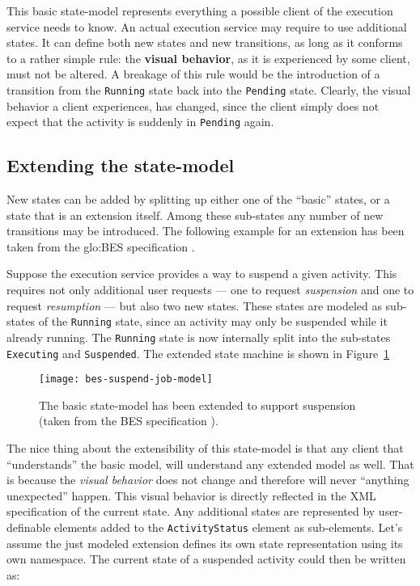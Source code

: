 This  basic state-model  represents everything  a possible  client  of the
execution service needs  to know. An actual execution  service may require
to  use  additional  states.   It  can  define both  new  states  and  new
transitions,  as  long  as  it  conforms  to a  rather  simple  rule:  the
\textbf{visual behavior}, as it is experienced by some client, must not be
altered. A breakage of this rule would be the introduction of a transition
from  the \texttt{Running}  state  back into  the \texttt{Pending}  state.
Clearly, the visual behavior a  client experiences, has changed, since the
client  simply  does   not  expect  that  the  activity   is  suddenly  in
\texttt{Pending} again.

\subsection{Extending the state-model}

New  states can  be added  by  splitting up  either one  of the  ``basic''
states, or  a state that is  an extension itself.   Among these sub-states
any number  of new transitions  may be introduced.  The  following example
for  an extension  has  been taken  from  the \gls{glo:BES}  specification
\cite{ogsa-bes}.

Suppose the execution service provides  a way to suspend a given activity.
This  requires  not only  additional  user  requests  --- one  to  request
\emph{suspension} and  one to request  \emph{resumption} --- but  also two
new states. These states are modeled as sub-states of the \texttt{Running}
state, since an  activity may only be suspended  while it already running.
The  \texttt{Running} state is  now internally  split into  the sub-states
\texttt{Executing} and \texttt{Suspended}.   The extended state machine is
shown in Figure~\ref{fig:bes-suspend-model}

\begin{figure}[h]
  \centering
  \texttt{[image: bes-suspend-job-model]}
  \caption[Extended  BES Job-State-Model]{The  basic state-model  has been
    extended  to  support suspension  (taken  from  the BES  specification
    \cite{ogsa-bes}).}
  \label{fig:bes-suspend-model}
\end{figure}

The nice  thing about  the extensibility of  this state-model is  that any
client that ``understands'' the  basic model, will understand any extended
model as well. That is  because the \emph{visual behavior} does not change
and  therefore  will never  ``anything  unexpected''  happen. This  visual
behavior is  directly reflected  in the XML  specification of  the current
state.  Any  additional states are represented  by user-definable elements
added  to  the  \texttt{ActivityStatus}  element as  sub-elements.   Let's
assume  the just modeled  extension defines  its own  state representation
using its own namespace.  The  current state of a suspended activity could
then be written as:


